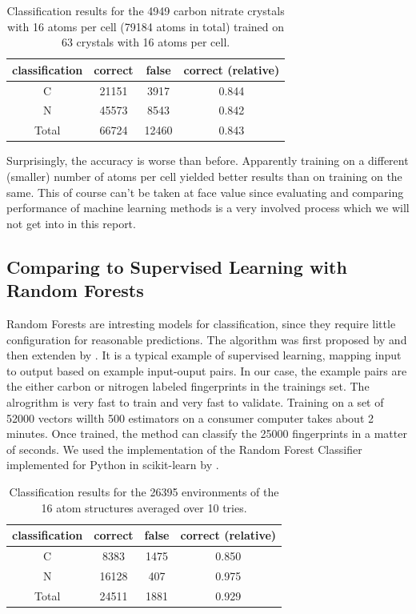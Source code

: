 \begin{table}[h!]
\center
\begin{tabular}{c|c|c|c}
classification & correct & false & correct (relative) \\ \hline
C              & 21151   & 3917  & 0.844              \\ \hline
N              & 45573   & 8543  & 0.842              \\ \hline
Total          & 66724   & 12460  & 0.843             
\end{tabular}
\caption{Classification results for the 4949 carbon nitrate crystals with 16 atoms per cell (79184 atoms in total) trained on 63 crystals with 16 atoms per cell.}
\label{table:res2}
\end{table}

Surprisingly, the accuracy is worse than before. Apparently training on a different (smaller) number of atoms per cell yielded better results than on training on the same. This of course can't be taken at face value since evaluating and comparing performance of machine learning methods is a very involved process which we will not get into in this report.



\subsection{Comparing to Supervised Learning with Random Forests}
Random Forests are intresting models for classification, since they require little configuration for reasonable predictions. The algorithm was first proposed by \citeauthor{Ho1995} \cite{Ho1995} and then extenden by \citeauthor{Breiman2001} \cite{Breiman2001}. It is a typical example of supervised learning, mapping input to output based on example input-ouput pairs. In our case, the example pairs are the either carbon or nitrogen labeled fingerprints in the trainings set.
The alrogrithm is very fast to train and very fast to validate. Training on a set of 52000 vectors willth 500 estimators on a consumer computer takes about 2 minutes. Once trained, the method can classify the 25000 fingerprints in a matter of seconds. We used the implementation of the Random Forest Classifier implemented for Python in scikit-learn by \citeauthor{scikit} \cite{scikit}. 

\begin{table}[h!]
\center
\begin{tabular}{c|c|c|c}
classification & correct & false & correct (relative) \\ \hline
C              & 8383   & 1475  & 0.850              \\ \hline
N              & 16128   & 407  & 0.975              \\ \hline
Total          & 24511   & 1881  & 0.929             
\end{tabular}
\caption{Classification results for the 26395 environments of the 16 atom structures averaged over 10 tries.}
\label{table:res3}
\end{table}

